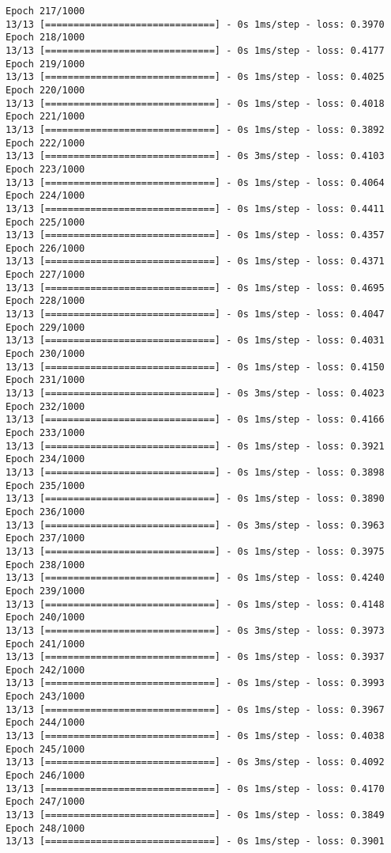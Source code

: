 \documentclass[11pt]{article}
\begin{document}
\begin{Verbatim}[commandchars=\\\{\}]
Epoch 217/1000
13/13 [==============================] - 0s 1ms/step - loss: 0.3970
Epoch 218/1000
13/13 [==============================] - 0s 1ms/step - loss: 0.4177
Epoch 219/1000
13/13 [==============================] - 0s 1ms/step - loss: 0.4025
Epoch 220/1000
13/13 [==============================] - 0s 1ms/step - loss: 0.4018
Epoch 221/1000
13/13 [==============================] - 0s 1ms/step - loss: 0.3892
Epoch 222/1000
13/13 [==============================] - 0s 3ms/step - loss: 0.4103
Epoch 223/1000
13/13 [==============================] - 0s 1ms/step - loss: 0.4064
Epoch 224/1000
13/13 [==============================] - 0s 1ms/step - loss: 0.4411
Epoch 225/1000
13/13 [==============================] - 0s 1ms/step - loss: 0.4357
Epoch 226/1000
13/13 [==============================] - 0s 1ms/step - loss: 0.4371
Epoch 227/1000
13/13 [==============================] - 0s 1ms/step - loss: 0.4695
Epoch 228/1000
13/13 [==============================] - 0s 1ms/step - loss: 0.4047
Epoch 229/1000
13/13 [==============================] - 0s 1ms/step - loss: 0.4031
Epoch 230/1000
13/13 [==============================] - 0s 1ms/step - loss: 0.4150
Epoch 231/1000
13/13 [==============================] - 0s 3ms/step - loss: 0.4023
Epoch 232/1000
13/13 [==============================] - 0s 1ms/step - loss: 0.4166
Epoch 233/1000
13/13 [==============================] - 0s 1ms/step - loss: 0.3921
Epoch 234/1000
13/13 [==============================] - 0s 1ms/step - loss: 0.3898
Epoch 235/1000
13/13 [==============================] - 0s 1ms/step - loss: 0.3890
Epoch 236/1000
13/13 [==============================] - 0s 3ms/step - loss: 0.3963
Epoch 237/1000
13/13 [==============================] - 0s 1ms/step - loss: 0.3975
Epoch 238/1000
13/13 [==============================] - 0s 1ms/step - loss: 0.4240
Epoch 239/1000
13/13 [==============================] - 0s 1ms/step - loss: 0.4148
Epoch 240/1000
13/13 [==============================] - 0s 3ms/step - loss: 0.3973
Epoch 241/1000
13/13 [==============================] - 0s 1ms/step - loss: 0.3937
Epoch 242/1000
13/13 [==============================] - 0s 1ms/step - loss: 0.3993
Epoch 243/1000
13/13 [==============================] - 0s 1ms/step - loss: 0.3967
Epoch 244/1000
13/13 [==============================] - 0s 1ms/step - loss: 0.4038
Epoch 245/1000
13/13 [==============================] - 0s 3ms/step - loss: 0.4092
Epoch 246/1000
13/13 [==============================] - 0s 1ms/step - loss: 0.4170
Epoch 247/1000
13/13 [==============================] - 0s 1ms/step - loss: 0.3849
Epoch 248/1000
13/13 [==============================] - 0s 1ms/step - loss: 0.3901

\end{Verbatim}
\end{document}
